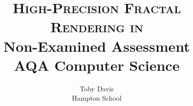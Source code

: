 \documentclass[12pt]{article}
\author{Toby Davis\\[0.2cm]Hampton School}
\title{
	\textsc{High-Precision Fractal Rendering in \CPP}\\[2.2cm]
	
	
	{\LARGE \bfseries
		Non-Examined Assessment}\\
	{\Large\bfseries
		AQA Computer Science}
}
\begin{document}
	
 
    \pagebreak
    
	
 
    \pagebreak
	
	
	\pagebreak
	
	
	\pagebreak
	
	
	\pagebreak
	

	\pagebreak
	
	
\end{document}
